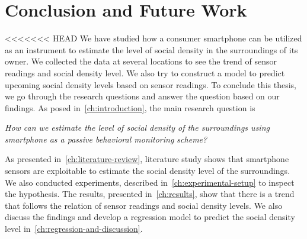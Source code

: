 \chapter{Conclusion and Future Work}
\label{ch:conclusion-future-work} %
<<<<<<< HEAD
We have studied how a consumer smartphone can be utilized as an instrument to estimate the level of social density in the surroundings of its owner. We collected the data at several locations to see the trend of sensor readings and social density level. We also try to construct a model to predict upcoming social density levels based on sensor readings. To conclude this thesis, we go through the research questions and answer the question based on our findings. As posed in~\autoref{ch:introduction}, the main research question is

\begin{displayquote}\textit{
How can we estimate the level of social density of the surroundings using smartphone as a passive behavioral monitoring scheme?}
\end{displayquote}

\noindent
As presented in~\autoref{ch:literature-review}, literature study shows that smartphone sensors are exploitable to estimate the social density level of the surroundings. We also conducted experiments, described in~\autoref{ch:experimental-setup} to inspect the hypothesis. The results, presented in~\autoref{ch:results}, show that there is a trend that follows the relation of sensor readings and social density levels. We also discuss the findings and develop a regression model to predict the social density level in~\autoref{ch:regression-and-discussion}.

